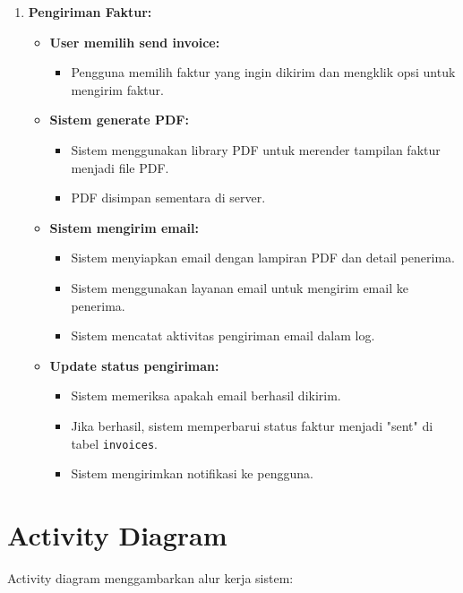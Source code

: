\documentclass[a4paper]{report}
\begin{document}
\begin{enumerate}
\item \textbf{Pengiriman Faktur:}
    \begin{itemize}
    \item \textbf{User memilih send invoice:}
        \begin{itemize}
        \item Pengguna memilih faktur yang ingin dikirim dan mengklik opsi untuk mengirim 
        faktur.
        \end{itemize}
    \item \textbf{Sistem generate PDF:}
        \begin{itemize}
        \item Sistem menggunakan library PDF untuk merender tampilan faktur menjadi file 
        PDF.
        \item PDF disimpan sementara di server.
        \end{itemize}
    \item \textbf{Sistem mengirim email:}
        \begin{itemize}
        \item Sistem menyiapkan email dengan lampiran PDF dan detail penerima.
        \item Sistem menggunakan layanan email untuk mengirim email ke penerima.
        \item Sistem mencatat aktivitas pengiriman email dalam log.
        \end{itemize}
    \item \textbf{Update status pengiriman:}
        \begin{itemize}
        \item Sistem memeriksa apakah email berhasil dikirim.
        \item Jika berhasil, sistem memperbarui status faktur menjadi "sent" di tabel 
        \texttt{invoices}.
        \item Sistem mengirimkan notifikasi ke pengguna.
        \end{itemize}
    \end{itemize}
\end{enumerate}

\section{Activity Diagram}
Activity diagram menggambarkan alur kerja sistem:
\end{document}
